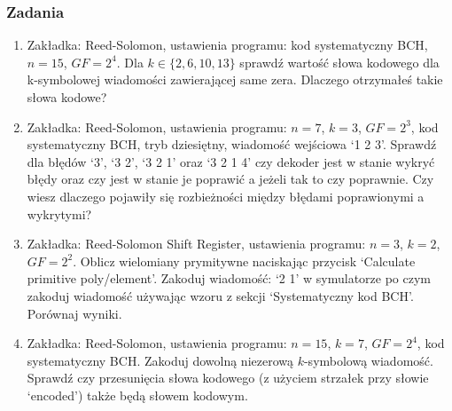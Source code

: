 \subsubsection{Zadania}

\begin{enumerate}
    \item Zakładka: Reed-Solomon, ustawienia programu: kod systematyczny BCH, $n=15$, $GF=2^4$.
    Dla $k \in \{ 2, 6, 10, 13 \}$ sprawdź wartość słowa kodowego dla k-symbolowej wiadomości zawierającej same zera. Dlaczego otrzymałeś takie słowa kodowe?
    \item Zakładka: Reed-Solomon, ustawienia programu: $n = 7$, $k = 3$, $GF = 2^3$,
    kod systematyczny BCH, tryb dziesiętny, wiadomość wejściowa `1 2 3'.
    Sprawdź dla błędów `3', `3 2', `3 2 1' oraz `3 2 1 4' czy dekoder jest w stanie
    wykryć błędy oraz czy jest w stanie je poprawić a jeżeli tak to czy poprawnie.
    Czy wiesz dlaczego pojawiły się rozbieżności między błędami poprawionymi a wykrytymi?
    \item Zakładka: Reed-Solomon Shift Register, ustawienia programu:
    $n = 3$, $k = 2$, $GF = 2^2$. Oblicz wielomiany prymitywne naciskając przycisk
    `Calculate primitive poly/element'.
    Zakoduj wiadomość: `2 1' w symulatorze po czym zakoduj wiadomość
    używając wzoru z sekcji `Systematyczny kod BCH'. Porównaj wyniki.
    \item Zakładka: Reed-Solomon, ustawienia programu: $n = 15$, $k=7$, $GF = 2^4$,
    kod systematyczny BCH.
    Zakoduj dowolną niezerową $k$-symbolową wiadomość. Sprawdź czy przesunięcia słowa kodowego
    (z użyciem strzałek przy słowie `encoded') także będą słowem kodowym.
\end{enumerate}
